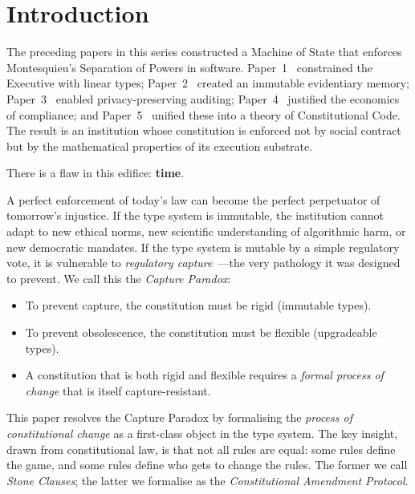 \section{Introduction}
\label{sec:intro}

The preceding papers in this series constructed a Machine of State
that enforces Montesquieu's Separation of Powers in software.
Paper~1~\cite{btv2026} constrained the Executive with linear types;
Paper~2~\cite{btv-t-repo} created an immutable evidentiary memory;
Paper~3~\cite{btv-ar2026} enabled privacy-preserving auditing;
Paper~4~\cite{btv-econ} justified the economics of compliance; and
Paper~5~\cite{btv-cc} unified these into a theory of Constitutional
Code. The result is an institution whose constitution is enforced not
by social contract but by the mathematical properties of its execution
substrate.

There is a flaw in this edifice: \textbf{time}.

A perfect enforcement of today's law can become the perfect
perpetuator of tomorrow's injustice. If the type system is immutable,
the institution cannot adapt to new ethical norms, new scientific
understanding of algorithmic harm, or new democratic mandates. If the
type system is mutable by a simple regulatory vote, it is vulnerable
to \emph{regulatory capture}~\cite{stigler1971}---the very pathology
it was designed to prevent. We call this the \emph{Capture Paradox}:

\begin{itemize}
  \item To prevent capture, the constitution must be rigid
  (immutable types).
  \item To prevent obsolescence, the constitution must be flexible
  (upgradeable types).
  \item A constitution that is both rigid and flexible requires a
  \emph{formal process of change} that is itself capture-resistant.
\end{itemize}

This paper resolves the Capture Paradox by formalising the
\emph{process of constitutional change} as a first-class object in
the type system. The key insight, drawn from constitutional law, is
that not all rules are equal: some rules define the game, and some
rules define who gets to change the rules. The former we call
\emph{Stone Clauses}; the latter we formalise as the
\emph{Constitutional Amendment Protocol}.

